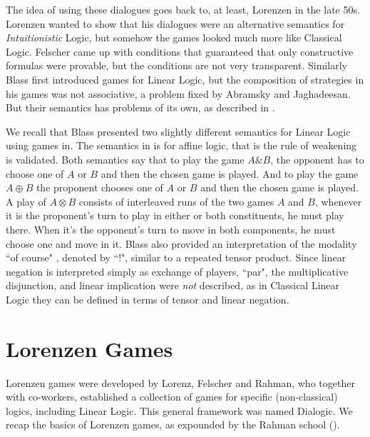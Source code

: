 \documentclass{article}
\begin{document}
 The idea of using these dialogues goes back  to, at least,  Lorenzen in the late 50s.
 Lorenzen wanted to show that his dialogues were an alternative semantics for {\em Intuitionistic} Logic, but somehow the games looked much more like Classical Logic. Felscher came up with conditions that guaranteed that only constructive formulas were provable, but the conditions are not very transparent. Similarly Blass first introduced games for Linear Logic, but the composition of strategies in his games was not associative, a problem fixed by Abramsky and Jaghadeesan. But their semantics has problems of its own, as described in \cite{blasssll}.
 
 We recall that Blass presented two slightly different semantics for Linear Logic using games in\cite{blass94, blass92}. The semantics in \cite{blass92} is for affine logic, that is the rule of weakening is validated. Both semantics say that
to play the game $A\&B $, the opponent has to choose one of $A$ or $B$ and then the chosen game is played. And to play the game $A\oplus B$ the proponent chooses one of $A$ or $B$ and then the chosen game is played.
 A play of $A\otimes B$ consists of interleaved runs of the two games $A$ and $B$, whenever it is the proponent's turn to play in either or both constituents, he must play there. When it's the opponent's turn to move in both components, he must choose one and move in it. Blass also provided an interpretation of the modality ``of course" , denoted by ``!", similar to a repeated tensor product. Since  linear negation is interpreted simply as exchange of players,  ``par", the multiplicative disjunction, and linear implication were {\em not} described, as in Classical Linear Logic they can be defined in terms of tensor and linear negation.
  
 \section*{Lorenzen Games}
Lorenzen games were developed by Lorenz, Felscher and  Rahman, who together with co-workers, established a collection of games for specific (non-classical) logics, including Linear Logic. This general framework was named Dialogic. We recap the basics of Lorenzen games, as expounded by the Rahman school (\cite{rahmankeiff04}). %
\end{document}
